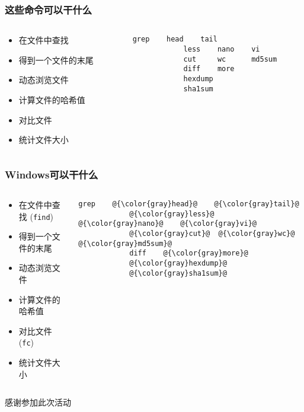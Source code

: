 \begin{CJK}{UTF8}{gbsn}
\begin{frame} [fragile]
	\frametitle{这些命令可以干什么}
	\linespread{1.5}
	\begin{columns}[T]
		\begin{column}[T]{.5\textwidth}
			\begin{itemize}
			\item 在文件中查找
			\item 得到一个文件的末尾
			\item 动态浏览文件
			\item 计算文件的哈希值
			\item 对比文件
			\item 统计文件大小
			\end{itemize}
		\end{column}
		\begin{column}[T]{.5\textwidth}
			\begin{lstlisting}[style=bashstyle, gobble=12, texcl]
			grep	head	tail
			less	nano	vi
			cut		wc		md5sum
			diff	more
			hexdump
			sha1sum
			\end{lstlisting}
		\end{column}
	\end{columns}
\end{frame}

\begin{frame} [fragile]
	\frametitle{Windows可以干什么}
	\linespread{1.5}
	\begin{columns}[T]
		\begin{column}[T]{.5\textwidth}
			\begin{itemize}
			\item 在文件中查找 (\texttt{find})
			\item {\color{gray}得到一个文件的末尾}
			\item {\color{gray}动态浏览文件}
			\item {\color{gray}计算文件的哈希值}
			\item 对比文件 (\texttt{fc})
			\item {\color{gray}统计文件大小}
			\end{itemize}
		\end{column}
		\begin{column}[T]{.5\textwidth}
			\begin{lstlisting}[style=bashstyle, gobble=12, texcl, escapechar=@]
			grep	@{\color{gray}head}@	@{\color{gray}tail}@
			@{\color{gray}less}@	@{\color{gray}nano}@	@{\color{gray}vi}@
			@{\color{gray}cut}@	 @{\color{gray}wc}@	   @{\color{gray}md5sum}@
			diff	@{\color{gray}more}@
			@{\color{gray}hexdump}@
			@{\color{gray}sha1sum}@
			\end{lstlisting}
		\end{column}
	\end{columns}
\end{frame}

\PreLastFrame
\begin{frame}
	\centerline{\fontsize{32}{32}\selectfont 感谢参加此次活动}
\end{frame}

\newpage
\end{CJK}


